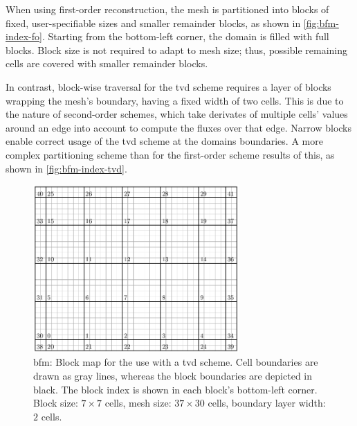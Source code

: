 When using first-order reconstruction, the mesh is partitioned into blocks of fixed, user-specifiable sizes and smaller remainder blocks, as shown in \autoref{fig:bfm-index-fo}.
Starting from the bottom-left corner, the domain is filled with full blocks. 
Block size is not required to adapt to mesh size; thus, possible remaining cells are covered with smaller remainder blocks.

In contrast, block-wise traversal for the \gls{tvd} scheme requires a layer of blocks wrapping the mesh's boundary, having a fixed width of two cells.
This is due to the nature of second-order schemes, which take derivates of multiple cells' values around an edge into account to compute the fluxes over that edge.
Narrow blocks enable correct usage of the \gls{tvd} scheme at the domains boundaries.
A more complex partitioning scheme than for the first-order scheme results of this, as shown in \autoref{fig:bfm-index-tvd}.

\begin{figure}[!b]
  \centering
  \includegraphics[width=0.7\textwidth]{../typst/bfm-index/bfm-index-tvd.pdf}
  \caption[\Acrlong{bfm}: Block map for \acrshort{tvd} scheme]{
    \Acrlong{bfm}: Block map for the use with a \acrshort{tvd} scheme.
    Cell boundaries are drawn as gray lines, whereas the block boundaries are depicted in black.
    The block index is shown in each block's bottom-left corner.
    Block size: $7 \times 7$ cells, mesh size: $37 \times 30$ cells, boundary layer width: $2$ cells.
  }
  \label{fig:bfm-index-tvd}
\end{figure}

